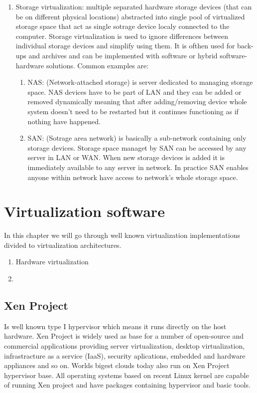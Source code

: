 \begin{itemize}
\begin{enumerate}
\begin{enumerate}
\item Storage virtualization: multiple separated hardware storage devices (that can be on different physical locations) abstracted into single pool of virtualized storage space that act as single sotrage device localy connected to the computer. Storage virtualization is used to ignore differences between individual storage devices and simplify using them. It is ofthen used for back-ups and archives and can be implemented with software or hybrid software-hardware solutions. Common examples are:
\begin{enumerate}
\item NAS: (Network-attached storage) is server dedicated to managing storage space. NAS devices have to be part of LAN and they can be added or removed dynamically meaning that after adding/removing device whole system doesn't need to be restarted but it continues functioning as if nothing have happened.
\item SAN: (Sotrage area network) is basically a sub-network containing only storage devices. Storage space managet by SAN can be accessed by any server in LAN or WAN. When new storage devices is added it is immediately available to any server in network. In practice SAN enables anyone within network have access to network's whole storage space.
\end{enumerate}
\end{enumerate}
\end{enumerate}


\chapter{Virtualization software}
In this chapter we will go through well known virtualization implementations divided to virtualization architectures.
\begin{enumerate}
\item Hardware virtualization
\item 
\end{enumerate}

\section{Xen Project}
Is well known type I hypervisor which means it runs directly on the host hardware. Xen Project is widely used as base for a number of open-source and commercial applications providing server virtualization, desktop virtualization, infrastracture as a service (IaaS), security aplications, embedded and hardware appliances and so on. Worlds bigest clouds today also run on Xen Project hypervisor base. All operating systems based on recent Linux kernel are capable of running Xen project and have packages containing hypervisor and basic tools.


\end{itemize}
